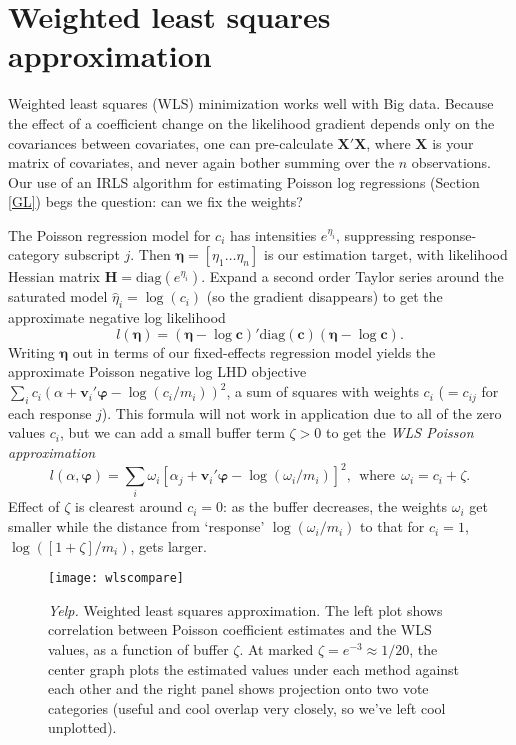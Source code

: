 \documentclass[12pt]{article}
\newcommand{\dbl}{\setstretch{1.5}}
\newcommand{\sgl}{\setstretch{1.1}}
\newcommand{\bs}[1]{\boldsymbol{#1}}
\newcommand{\mr}[1]{\mathrm{#1}}
\newcommand{\bm}[1]{\mathbf{#1}}
\begin{document}
\sgl\small



\appendix
\dbl
\normalsize

\section{Weighted least squares approximation}
\label{WLS}

Weighted least squares (WLS) minimization works well with Big data.  Because the effect of a coefficient change on the likelihood gradient depends only on the covariances between covariates, one can pre-calculate $\bm{X}'\bm{X}$, where $\bm{X}$ is your matrix of covariates, and never again bother summing over the $n$ observations.
Our use of an IRLS algorithm for estimating Poisson log regressions (Section \ref{GL}) begs the question: can we fix the weights? 

The Poisson regression model for $c_i$ has intensities $e^{\eta_{i}}$, suppressing response-category subscript $j$. Then
 $\bs{\eta} = [\eta_{1} \ldots \eta_{n}]$ is our estimation target,
with likelihood Hessian matrix $\bm{H} = \mr{diag}(e^{\eta_{i}})$.
Expand a second order Taylor series around the saturated model $\hat\eta_{i}
= \log(c_{i})$ (so the gradient disappears) to get the approximate negative
log likelihood 
\begin{equation}
l(\bs{\eta}) = (\bs{\eta} - \log\bm{c})'
\mr{diag}( \bm{c} )(\bs{\eta} - \log\bm{c}). 
\end{equation} 
Writing $\bs{\eta}$
out in terms of our fixed-effects regression model yields the approximate
Poisson negative log LHD objective $\sum_i c_{i}(\alpha +
\bm{v}_i'\bs{\varphi} - \log(c_{i}/m_i))^2$, a sum of squares with weights $c_{i}$ ($=c_{ij}$ for each response $j$). This formula will not work in application due to all of the zero values $c_i$, but we can add a small buffer term $\zeta > 0$ to get the {\it WLS Poisson approximation}
\begin{equation}\label{wls}
l(\alpha, \bs{\varphi}) = \sum_i \omega_i
\left[\alpha_j + \bm{v}_i'\bs{\varphi} - \log(\omega_i/m_i)\right]^2, ~~\text{where}~~\omega_i = c_i + \zeta.
\end{equation}
Effect of $\zeta$ is clearest around $c_i = 0$: as the buffer decreases, the weights $\omega_i$ get smaller while the distance from `response' $\log(\omega_i/m_i)$ to that for $c_i=1$, $\log( [1+\zeta]/m_i )$, gets larger.

\begin{figure}
\texttt{[image: wlscompare]}
\caption{\label{wlspic} {\it Yelp.} Weighted least squares approximation.  The left plot shows correlation between  Poisson coefficient estimates and the WLS values, as a function of buffer $\zeta$. At marked $\zeta=e^{-3}\approx 1/20$, the center graph plots the estimated values under each method against each other and the right panel shows projection onto two vote categories (useful and cool overlap very closely, so we've left cool unplotted).}
\end{figure}
\end{document}
